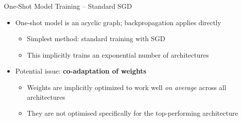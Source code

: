 \documentclass[main]{subfiles}
\begin{document}
\begin{frame}{One-Shot Model Training -- Standard SGD }
    \begin{itemize}
        \item One-shot model is an acyclic graph; backpropagation applies directly
        \begin{itemize}
			\item Simplest method: standard training with SGD
			\item This implicitly trains \alert{an exponential number of architectures}
        \end{itemize}
		\item Potential issue: \textbf{co-adaptation of weights}
        \begin{itemize}
			\item Weights are implicitly optimized to work well \emph{on average} across all architectures
			\item They are \alert{not} optimised specifically for the top-performing architecture
            
        \end{itemize}
    \end{itemize}	
    				
\end{frame}
\end{document}
